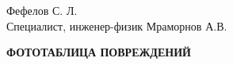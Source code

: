 
\hfill    {   Фефелов С. Л.}\\
{Специалист, инженер-физик}\hfill           { Мраморнов А.В.}

\vspace{15mm}
\pagebreak

\begin{center}
 \textbf{{\Large    ФОТОТАБЛИЦА ПОВРЕЖДЕНИЙ}}
\end{center}

